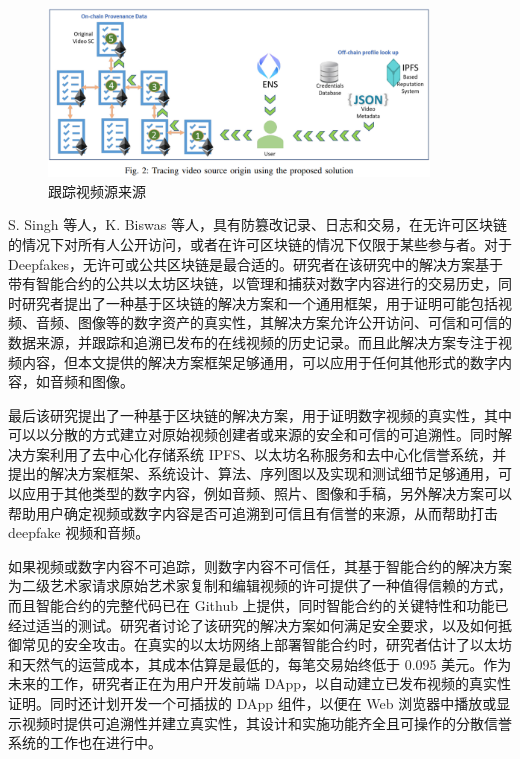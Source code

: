 \begin{figure}[htb]
\centering 
\includegraphics[width=0.90\textwidth]{img/p7m2.png} 
\caption{跟踪视频源来源}
\label{Test}
\end{figure}

S. Singh 等人，K. Biswas 等人，具有防篡改记录、日志和交易，在无许可区块链的情况下对所有人公开访问，或者在许可区块链的情况下仅限于某些参与者。对于 Deepfakes，无许可或公共区块链是最合适的。研究者在该研究中的解决方案基于带有智能合约的公共以太坊区块链，以管理和捕获对数字内容进行的交易历史，同时研究者提出了一种基于区块链的解决方案和一个通用框架，用于证明可能包括视频、音频、图像等的数字资产的真实性，其解决方案允许公开访问、可信和可信的数据来源，并跟踪和追溯已发布的在线视频的历史记录。而且此解决方案专注于视频内容，但本文提供的解决方案框架足够通用，可以应用于任何其他形式的数字内容，如音频和图像。

最后该研究提出了一种基于区块链的解决方案，用于证明数字视频的真实性，其中可以以分散的方式建立对原始视频创建者或来源的安全和可信的可追溯性。同时解决方案利用了去中心化存储系统 IPFS、以太坊名称服务和去中心化信誉系统，并提出的解决方案框架、系统设计、算法、序列图以及实现和测试细节足够通用，可以应用于其他类型的数字内容，例如音频、照片、图像和手稿，另外解决方案可以帮助用户确定视频或数字内容是否可追溯到可信且有信誉的来源，从而帮助打击 deepfake 视频和音频。

如果视频或数字内容不可追踪，则数字内容不可信任，其基于智能合约的解决方案为二级艺术家请求原始艺术家复制和编辑视频的许可提供了一种值得信赖的方式，而且智能合约的完整代码已在 Github 上提供，同时智能合约的关键特性和功能已经过适当的测试。研究者讨论了该研究的解决方案如何满足安全要求，以及如何抵御常见的安全攻击。在真实的以太坊网络上部署智能合约时，研究者估计了以太坊和天然气的运营成本，其成本估算是最低的，每笔交易始终低于 0.095 美元。作为未来的工作，研究者正在为用户开发前端 DApp，以自动建立已发布视频的真实性证明。同时还计划开发一个可插拔的 DApp 组件，以便在 Web 浏览器中播放或显示视频时提供可追溯性并建立真实性，其设计和实施功能齐全且可操作的分散信誉系统的工作也在进行中。



